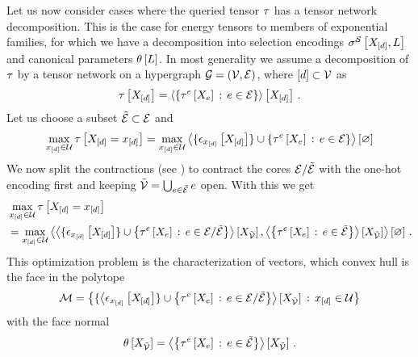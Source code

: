 \begin{example}
    Let us now consider cases where the queried tensor $\tau$ has a tensor network decomposition.
    This is the case for energy tensors to members of exponential families, for which we have a decomposition into selection encodings $\sigma^{\mathcal{S}}\left[X_{[d]},L\right]$ and canonical parameters $\theta\left[L\right]$.
    In most generality we assume a decomposition of $\tau$ by a tensor network on a hypergraph $\mathcal{G}=(\mathcal{V},\mathcal{E})$, where $[d]\subset\mathcal{V}$ as
    \begin{align*}
        \tau\left[X_{[d]}\right] = \left\langle \left\{\tau^{e}\left[X_{e}\right]\, : \, e\in\mathcal{E}\right\}\right\rangle \left[ X_{[d]} \right] \, .
    \end{align*}
    Let us choose a subset $\tilde{\mathcal{E}}\subset\mathcal{E}$ and
    \begin{align*}
        \max_{x_{[d]}\in\mathcal{U}} \tau\left[X_{[d]}=x_{[d]}\right]
        = \max_{x_{[d]}\in\mathcal{U}} \left\langle \{\epsilon_{x_{[d]}}\left[X_{[d]}\right]\} \cup \left\{\tau^{e}\left[X_{e}\right]\, : \, e\in\mathcal{E}\right\}\right\rangle \left[ \varnothing \right]
    \end{align*}
    We now split the contractions (see ) to contract the cores $\mathcal{E}/\tilde{\mathcal{E}}$ with the one-hot encoding first and keeping $\tilde{\mathcal{V}}=\bigcup_{e\in\tilde{\mathcal{E}}}e$ open.
    With this we get
    \begin{align*}
        & \max_{x_{[d]}\in\mathcal{U}} \tau\left[X_{[d]}=x_{[d]}\right] \\
        & = \max_{x_{[d]}\in\mathcal{U}}
        \left\langle 
            \left\langle \{\epsilon_{x_{[d]}}\left[X_{[d]}\right]\} \cup \left\{\tau^{e}\left[X_{e}\right]\, : \, e\in\mathcal{E}/\tilde{\mathcal{E}}\right\}\right\rangle \left[ X_{\tilde{\mathcal{V}}} \right],
            \left\langle \left\{\tau^{e}\left[X_{e}\right]\, : \, e\in\tilde{\mathcal{E}}\right\}\right\rangle \left[ X_{\tilde{\mathcal{V}}} \right]
        \right\rangle \left[ \varnothing \right] \, .
    \end{align*}
    This optimization problem is the characterization of vectors, which convex hull is the face in the polytope
    \begin{align*}
        \mathcal{M} = \left\{\{\left\langle \epsilon_{x_{[d]}}\left[X_{[d]}\right]\} \cup \left\{\tau^{e}\left[X_{e}\right]\, : \, e\in\mathcal{E}/\tilde{\mathcal{E}}\right\}\right\rangle \left[ X_{\tilde{\mathcal{V}}} \right] \, : \, x_{[d]}\in\mathcal{U} \right\}
    \end{align*}
    with the face normal
    \begin{align*}
        \theta\left[X_{\tilde{\mathcal{V}}}\right] =
        \left\langle \left\{\tau^{e}\left[X_{e}\right]\, : \, e\in\tilde{\mathcal{E}}\right\}\right\rangle \left[ X_{\tilde{\mathcal{V}}} \right] \, .
    \end{align*}
\end{example}



